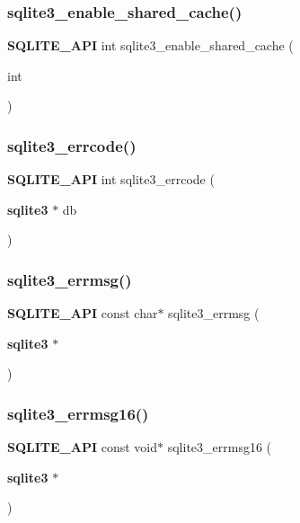 \mbox{\label{sqlite3_8h_a594f2fee186395efca5802e131018fdd}} 
\subsubsection{sqlite3\_enable\_shared\_cache()}
{\footnotesize\ttfamily \textbf{ S\+Q\+L\+I\+T\+E\+\_\+\+A\+PI} int sqlite3\+\_\+enable\+\_\+shared\+\_\+cache (\begin{DoxyParamCaption}\item[{int}]{ }\end{DoxyParamCaption})}

\mbox{\label{sqlite3_8h_a79bd13f5c8b7a6ccc6fd76fc7fc2104c}} 
\subsubsection{sqlite3\_errcode()}
{\footnotesize\ttfamily \textbf{ S\+Q\+L\+I\+T\+E\+\_\+\+A\+PI} int sqlite3\+\_\+errcode (\begin{DoxyParamCaption}\item[{\textbf{ sqlite3} $\ast$}]{db }\end{DoxyParamCaption})}

\mbox{\label{sqlite3_8h_a837fcee5d377d9b9b1ba08b61a5bbb42}} 
\subsubsection{sqlite3\_errmsg()}
{\footnotesize\ttfamily \textbf{ S\+Q\+L\+I\+T\+E\+\_\+\+A\+PI} const char$\ast$ sqlite3\+\_\+errmsg (\begin{DoxyParamCaption}\item[{\textbf{ sqlite3} $\ast$}]{ }\end{DoxyParamCaption})}

\mbox{\label{sqlite3_8h_afec1ef428d2c340883f6bf18bac5fe6d}} 
\subsubsection{sqlite3\_errmsg16()}
{\footnotesize\ttfamily \textbf{ S\+Q\+L\+I\+T\+E\+\_\+\+A\+PI} const void$\ast$ sqlite3\+\_\+errmsg16 (\begin{DoxyParamCaption}\item[{\textbf{ sqlite3} $\ast$}]{ }\end{DoxyParamCaption})}

